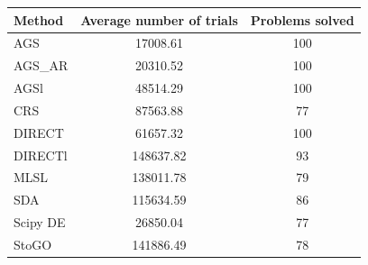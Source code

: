 \documentclass[a4paper]{article}
\begin{document}
\begin{tabular}{lcc}
\hline
 Method   &  Average number of trials  &  Problems solved  \\
\hline
 AGS      &          17008.61          &        100        \\
 AGS\_AR   &          20310.52          &        100        \\
 AGSl     &          48514.29          &        100        \\
 CRS      &          87563.88          &        77         \\
 DIRECT   &          61657.32          &        100        \\
 DIRECTl  &         148637.82          &        93         \\
 MLSL     &         138011.78          &        79         \\
 SDA      &         115634.59          &        86         \\
 Scipy DE &          26850.04          &        77         \\
 StoGO    &         141886.49          &        78         \\
\hline
\end{tabular}
\end{document}

